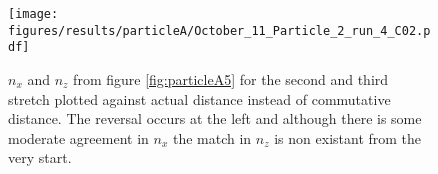  \begin{figure}[H]
 \centering
 \texttt{[image: figures/results/particleA/October\_11\_Particle\_2\_run\_4\_C02.pdf]}
 \caption{$n_x$ and $n_z$ from figure \ref{fig:particleA5} for the second and third stretch plotted against actual distance instead of commutative distance. The reversal occurs at the left and although there is some moderate agreement in $n_x$ the match in $n_z$ is non existant from the very start.}
 \label{fig:particleABadReversal}
 \end{figure}

